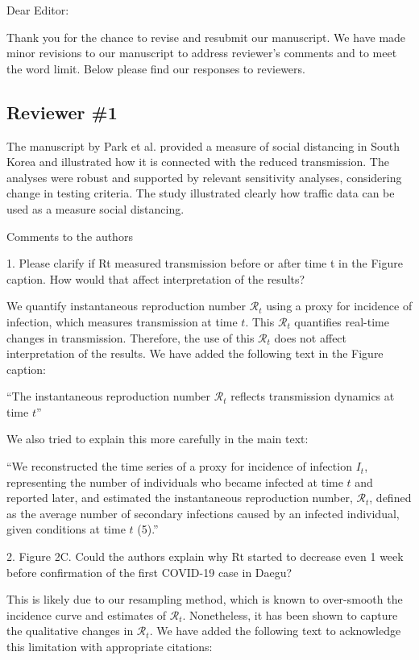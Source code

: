 \documentclass[12pt]{article}
\newcommand{\rev}{\subsection*}
\newcommand{\revtext}{\textsf}
\begin{document}
\noindent Dear Editor:

Thank you for the chance to revise and resubmit our manuscript. 
We have made minor revisions to our manuscript to address reviewer's comments and to meet the word limit.
Below please find our responses to reviewers.

\rev{Reviewer \#1}

\revtext{The manuscript by Park et al. provided a measure of social distancing in South Korea and illustrated how it is connected with the reduced transmission. The analyses were robust and supported by relevant sensitivity analyses, considering change in testing criteria. The study illustrated clearly how traffic data can be used as a measure social distancing.}

\revtext{Comments to the authors}

\revtext{1.	Please clarify if Rt measured transmission before or after time t in the Figure caption. How would that affect interpretation of the results?}

We quantify instantaneous reproduction number $\mathcal R_t$ using a proxy for incidence of infection, which measures transmission at time $t$.
This $\mathcal R_t$ quantifies real-time changes in transmission.
Therefore, the use of this $\mathcal R_t$ does not affect interpretation of the results. 
We have added the following text in the Figure caption:

``The instantaneous reproduction number $\mathcal R_t$ reflects transmission dynamics at time $t$''

We also tried to explain this more carefully in the main text:

``We reconstructed the time series of a proxy for incidence of infection $I_t$, representing the number of individuals who became infected at time $t$ and reported later, and estimated the instantaneous reproduction number, $\mathcal R_t$, defined as the average number of secondary infections caused by an infected individual, given conditions at time $t$ (5).''

\revtext{2.	Figure 2C. Could the authors explain why Rt started to decrease even 1 week before confirmation of the first COVID-19 case in Daegu? }

This is likely due to our resampling method, which is known to over-smooth the incidence curve and estimates of $\mathcal R_t$. Nonetheless, it has been shown to capture the qualitative changes in $\mathcal R_t$. We have added the following text to acknowledge this limitation with appropriate citations:
\end{document}
